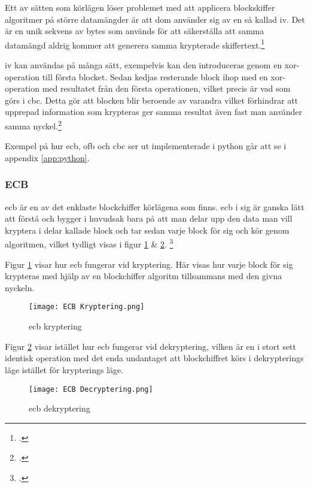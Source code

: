 Ett av sätten som körlägen löser problemet med att applicera blockskiffer algoritmer på
större datamängder är att dom använder sig av en så kallad \acrfull{iv}. Det är en unik sekvens
av bytes som används för att säkerställa att samma datamängd aldrig kommer att generera samma
krypterade skiffertext.\footcite{dworkin2001sp}

\acrshort{iv} kan användas på många sätt, exempelvis kan den introduceras genom en
\gls{xor}-operation till första blocket. Sedan kedjas resterande block ihop med en \gls{xor}-operation med resultatet från
den första operationen, vilket precis är vad som görs i \acrshort{cbc}. Detta gör att blocken blir beroende av varandra
vilket förhindrar att upprepad information som krypteras ger samma resultat även fast man använder samma
nyckel.\footcite{dworkin2001sp}

Exempel på hur \acrshort{ecb}, \acrshort{ofb} och \acrshort{cbc} ser ut implementerade i \gls{python} går att se i appendix \ref{app:python}.

\subsubsection{ECB}
\label{sec:ecb}
\acrfull{ecb} är en av det enklaste blockchiffer körlägena som finns.
\acrshort{ecb} i sig är ganska lätt att förstå och bygger i huvudsak bara på
att man delar upp den data man vill kryptera i delar kallade block och tar sedan varje
block för sig och kör genom algoritmen, vilket tydligt visas i
figur \ref{fig:ecb-mode-enc} \& \ref{fig:ecb-mode-dec}.
\footcite{dworkin2001sp}

Figur \ref{fig:ecb-mode-enc} visar hur \acrshort{ecb} fungerar vid kryptering.
Här visas hur varje block för sig krypteras med hjälp av en blockchiffer algoritm
tillsammans med den givna nyckeln.

\begin{figure}[H]
    \texttt{[image: ECB Kryptering.png]}
    \caption{\acrlong{ecb} kryptering}
    \label{fig:ecb-mode-enc}
\end{figure}

Figur \ref{fig:ecb-mode-dec} visar istället hur \acrshort{ecb} fungerar vid
dekryptering, vilken är en i stort sett identisk operation med det enda undantaget
att blockchiffret körs i dekrypterings läge istället för krypterings läge.

\begin{figure}[H]
    \texttt{[image: ECB Decryptering.png]}
    \caption{\acrlong{ecb} dekryptering}
    \label{fig:ecb-mode-dec}
\end{figure}

